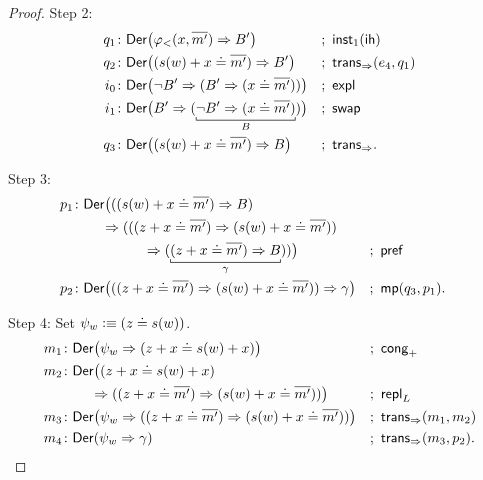 \begin{proof}
    Step 2:
    \begin{align*}
        q_1&\colon\fun{Der}\bigl(
            \varphi_<(x,\num{m'})\imp B'
        \bigr)
            &&;\ \fun{inst}_1(\fun{ih})\\
        q_2&\colon\fun{Der}\bigl(
            (s(w)+x\doteq\num{m'})\imp B'
        \bigr)
            &&;\ \fun{trans}_{\imp}(e_4,q_1)\\
        i_0&\colon\fun{Der}\bigl(
            \neg B'\imp(B'\imp(x\doteq\num{m'}))
        \bigr)
            &&;\ \fun{expl}\\
        i_1&\colon\fun{Der}\bigl(
            B'\imp(
                \explain[B]{
                    \neg B'\imp(x\doteq\num{m'})
                }
            )
        \bigr)
            &&;\ \fun{swap}\\
        q_3&\colon\fun{Der}\bigl(
            (s(w)+x\doteq\num{m'})\imp B
        \bigr)
            &&;\ \fun{trans}_{\imp}.
    \end{align*}
    
    Step 3:
    \begin{align*}
        p_1&\colon\fun{Der}\bigl(
            ((s(w)+x\doteq\num{m'})\imp B)\\
            &\qquad\imp(
                (
                    (z+x\doteq\num{m'})
                    \imp
                    (s(w)+x\doteq\num{m'})
                )\\
                &\quad\quad\quad\quad\quad\imp(
                    \explain[\gamma]{
                        (z+x\doteq\num{m'})\imp B
                    }
                )
            )
        \bigr)
            &&;\ \fun{pref}\\
        p_2&\colon\fun{Der}\bigl(
            ((z+x\doteq\num{m'})\imp(s(w)+x\doteq\num{m'}))
            \imp
            \gamma
        \bigr)
            &&;\ \fun{mp}(q_3,p_1).
    \end{align*}
    
    Step 4: Set $\psi_w\mathrel{\vcentcolon}\equiv(z\doteq s(w))$.
    \begin{align*}
        m_1&\colon\fun{Der}\bigl(
            \psi_w\imp(z+x\doteq s(w)+x)
        \bigr)
            &&;\ \fun{cong}_+\\
        m_2&\colon\fun{Der}\bigl(
            (z+x\doteq s(w)+x)\\
            &\qquad\imp(
                (z+x\doteq\num{m'})
                \imp(s(w)+x\doteq\num{m'})
            )
        \bigr)
            &&;\ \fun{repl}_L\\
        m_3&\colon\fun{Der}\bigl(
            \psi_w
            \imp(
                (z+x\doteq\num{m'})
                \imp
                (s(w)+x\doteq\num{m'})
            )
        \bigr)
            &&;\ \fun{trans}_{\imp}(m_1,m_2)\\
        m_4&\colon\fun{Der}(\psi_w\imp\gamma)
            &&;\ \fun{trans}_{\imp}(m_3,p_2).
    \end{align*}


\end{proof}

